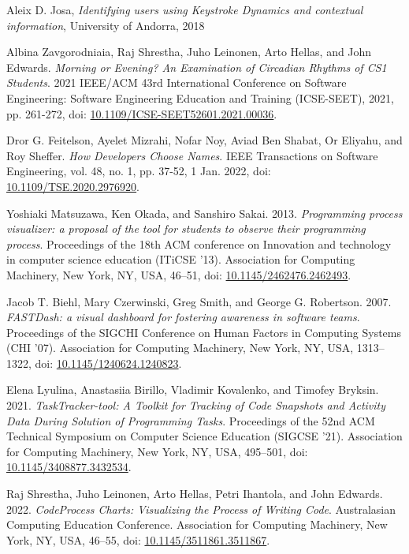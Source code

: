 \begin{thebibliography}{99}
 Aleix D. Josa, \textit{Identifying users using Keystroke Dynamics and contextual information}, University of Andorra, 2018

 Albina Zavgorodniaia, Raj Shrestha, Juho Leinonen, Arto Hellas, and John Edwards. \textit{Morning or Evening? An Examination of Circadian Rhythms of CS1 Students}. 2021 IEEE/ACM 43rd International Conference on Software Engineering: Software Engineering Education and Training (ICSE-SEET), 2021, pp. 261-272, doi: \href{https://doi.org/10.1109/ICSE-SEET52601.2021.00036}{10.1109/ICSE-SEET52601.2021.00036}.

 Dror G. Feitelson, Ayelet Mizrahi, Nofar Noy, Aviad Ben Shabat, Or Eliyahu, and Roy Sheffer. \textit{How Developers Choose Names}. IEEE Transactions on Software Engineering, vol. 48, no. 1, pp. 37-52, 1 Jan. 2022, doi: \href{https://doi.org/10.1109/TSE.2020.2976920}{10.1109/TSE.2020.2976920}.

 Yoshiaki Matsuzawa, Ken Okada, and Sanshiro Sakai. 2013. \textit{Programming process visualizer: a proposal of the tool for students to observe their programming process}. Proceedings of the 18th ACM conference on Innovation and technology in computer science education (ITiCSE '13). Association for Computing Machinery, New York, NY, USA, 46–51, doi: \href{https://doi.org/10.1145/2462476.2462493}{10.1145/2462476.2462493}.

 Jacob T. Biehl, Mary Czerwinski, Greg Smith, and George G. Robertson. 2007. \textit{FASTDash: a visual dashboard for fostering awareness in software teams}. Proceedings of the SIGCHI Conference on Human Factors in Computing Systems (CHI '07). Association for Computing Machinery, New York, NY, USA, 1313–1322, doi: \href{https://doi.org/10.1145/1240624.1240823}{10.1145/1240624.1240823}.

 Elena Lyulina, Anastasiia Birillo, Vladimir Kovalenko, and Timofey Bryksin. 2021. \textit{TaskTracker-tool: A Toolkit for Tracking of Code Snapshots and Activity Data During Solution of Programming Tasks}. Proceedings of the 52nd ACM Technical Symposium on Computer Science Education (SIGCSE '21). Association for Computing Machinery, New York, NY, USA, 495–501, doi: \href{https://doi.org/10.1145/3408877.3432534}{10.1145/3408877.3432534}.

 Raj Shrestha, Juho Leinonen, Arto Hellas, Petri Ihantola, and John Edwards. 2022. \textit{CodeProcess Charts: Visualizing the Process of Writing Code}. Australasian Computing Education Conference. Association for Computing Machinery, New York, NY, USA, 46–55, doi: \href{https://doi.org/10.1145/3511861.3511867}{10.1145/3511861.3511867}.


\end{thebibliography}
